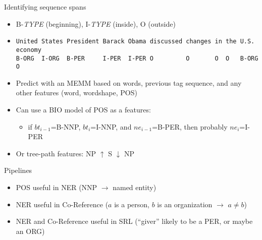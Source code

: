 \documentclass[11pt,letterpaper]{article}
\begin{document}
Identifying sequence spans

\begin{itemize}
  \item B-\textit{TYPE} (beginning), I-\textit{TYPE} (inside), O (outside)
  \item 
\begin{verbatim}
United States President Barack Obama discussed changes in the U.S.  economy
B-ORG  I-ORG  B-PER     I-PER  I-PER O         O       O  O   B-ORG O
\end{verbatim}
  \item Predict with an MEMM based on words, previous tag sequence, and any other features (word, wordshape, POS)
  \item Can use a BIO model of POS as a features: 
    \begin{itemize}
      \item if $bt_{i-1}$=B-NNP, $bt_i$=I-NNP, and $ne_{i-1}$=B-PER, then probably $ne_i$=I-PER
    \end{itemize}
  \item Or tree-path features: NP $\uparrow$ S $\downarrow$ NP
\end{itemize}

Pipelines
\begin{itemize}
  \item POS useful in NER (NNP $\rightarrow$ named entity)
  \item NER useful in Co-Reference ($a$ is a person, $b$ is an organization $\rightarrow$ $a \neq b$)
  \item NER and Co-Reference useful in SRL (``giver'' likely to be a PER, or maybe an ORG)
\end{itemize}
\end{document}
